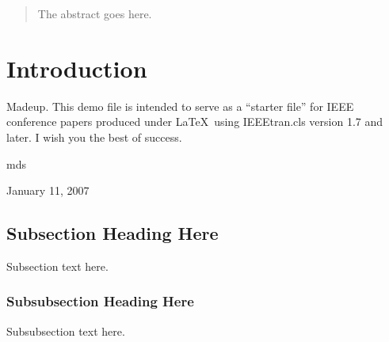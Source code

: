\documentclass[conference,10pt]{IEEEtran}
\begin{document}




\maketitle


\begin{abstract}
The abstract goes here.
\end{abstract}





%
\IEEEpeerreviewmaketitle



\section{Introduction}
Madeup.
This demo file is intended to serve as a ``starter file''
for IEEE conference papers produced under \LaTeX\ using
IEEEtran.cls version 1.7 and later.
I wish you the best of success.

\hfill mds
 
\hfill January 11, 2007

\subsection{Subsection Heading Here}
Subsection text here.


\subsubsection{Subsubsection Heading Here}
Subsubsection text here.
\end{document}
